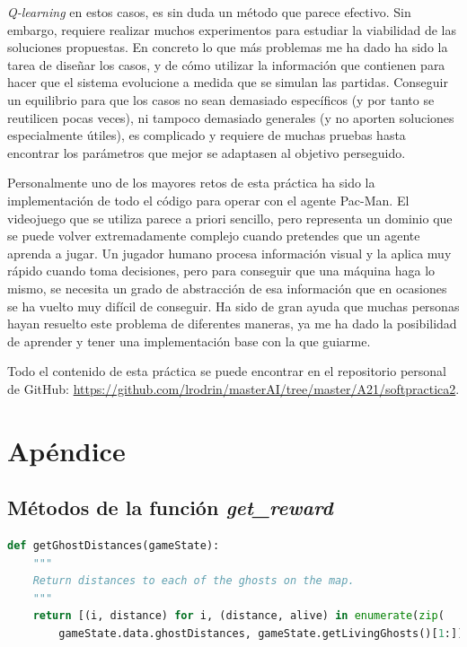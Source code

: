 \documentclass[11pt]{exam}
\begin{document}
\textit{Q-learning} en estos casos, es sin duda un método que parece efectivo. Sin embargo, requiere realizar muchos experimentos para estudiar la viabilidad de las soluciones propuestas. En concreto lo que más problemas me ha dado ha sido la tarea de diseñar los casos, y de cómo utilizar la información que contienen para hacer que el sistema evolucione a medida que se simulan las partidas. Conseguir un equilibrio para que los casos no sean demasiado específicos (y por tanto se reutilicen pocas veces), ni tampoco demasiado generales (y no aporten soluciones especialmente útiles), es complicado y requiere de muchas pruebas hasta encontrar los parámetros que mejor se adaptasen al objetivo perseguido.

Personalmente uno de los mayores retos de esta práctica ha sido la implementación de todo el código para operar con el agente Pac-Man. El videojuego que se utiliza parece a priori sencillo, pero representa un dominio que se puede volver extremadamente complejo cuando pretendes que un agente aprenda a jugar. Un jugador humano procesa información visual y la aplica muy rápido cuando toma decisiones, pero para conseguir que una máquina haga lo mismo, se necesita un grado de abstracción de esa información que en ocasiones se ha vuelto muy difícil de conseguir. Ha sido de gran ayuda que muchas personas hayan resuelto este problema de diferentes maneras, ya me ha dado la posibilidad de aprender y tener una implementación base con la que guiarme.

Todo el contenido de esta práctica se puede encontrar en el repositorio personal de GitHub: \url{https://github.com/lrodrin/masterAI/tree/master/A21/softpractica2}.

\section{Apéndice}\label{apendice}

\subsection{Métodos de la función \textit{get\_reward}}\label{apendice_reward}

\begin{lstlisting}[caption={Función getGhostDistances.}, label={getGhostDistances}, language=python, basicstyle=\footnotesize]
def getGhostDistances(gameState):
	"""
	Return distances to each of the ghosts on the map.
	"""
	return [(i, distance) for i, (distance, alive) in enumerate(zip(
		gameState.data.ghostDistances, gameState.getLivingGhosts()[1:])) if alive]
\end{lstlisting}
\end{document}
